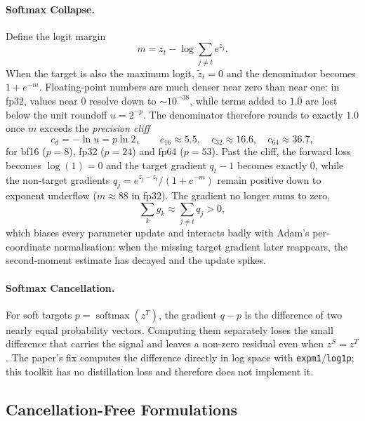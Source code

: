 \paragraph{Softmax Collapse.} Define the logit margin
\begin{equation}
m = z_t - \log \sum_{j \neq t} e^{z_j}.
\label{eq:margin}
\end{equation}
When the target is also the maximum logit, $\tilde{z}_t = 0$ and the denominator becomes $1 + e^{-m}$. Floating-point numbers are much denser near zero than near one: in fp32, values near $0$ resolve down to $\sim\!10^{-38}$, while terms added to $1.0$ are lost below the unit roundoff $u = 2^{-p}$. The denominator therefore rounds to exactly $1.0$ once $m$ exceeds the \emph{precision cliff}
\begin{equation}
c_d = -\ln u = p \ln 2 ,
\qquad
c_{16} \approx 5.5, \quad c_{32} \approx 16.6, \quad c_{64} \approx 36.7,
\label{eq:cliff}
\end{equation}
for bf16 ($p = 8$), fp32 ($p = 24$) and fp64 ($p = 53$). Past the cliff, the forward loss becomes $\log(1) = 0$ and the target gradient $q_t - 1$ becomes exactly $0$, while the non-target gradients $q_j = e^{z_j - z_t}/(1 + e^{-m})$ remain positive down to exponent underflow ($m \approx 88$ in fp32). The gradient no longer sums to zero,
\begin{equation}
\sum_k g_k \approx \sum_{j \neq t} q_j > 0 ,
\label{eq:broken-zero-sum}
\end{equation}
which biases every parameter update and interacts badly with Adam's per-coordinate normalisation: when the missing target gradient later reappears, the second-moment estimate has decayed and the update spikes.

\paragraph{Softmax Cancellation.} For soft targets $p = \operatorname{softmax}(z^{T})$, the gradient $q - p$ is the difference of two nearly equal probability vectors. Computing them separately loses the small difference that carries the signal and leaves a non-zero residual even when $z^{S} = z^{T}$. The paper's fix computes the difference directly in log space with \texttt{expm1}/\texttt{log1p}; this toolkit has no distillation loss and therefore does not implement it.

\subsection{Cancellation-Free Formulations}
\label{sec:fixed-formulations}

